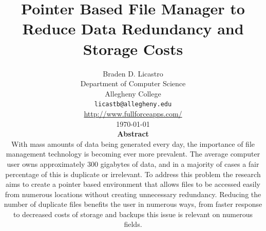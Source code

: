 \documentclass[11pt]{article}
\def\widow#1{\vskip #1\vbadness10000\penalty-200\vskip-#1}
\begin{document}



\def\widow#1{\vskip #1\vbadness10000\penalty-200\vskip-#1}


\makeatletter

\def\maketitle{%
  \thispagestyle{empty}%
  \begin{center}%
    {\Huge \@title\par}%
    {\normalsize \@author\par}%
    \vskip .4in
  \end{center}%

  }

\makeatother

\vspace*{-1.1in}
\title{Pointer Based File Manager to Reduce Data Redundancy and Storage Costs}

\author{Braden D. Licastro\\
Department of Computer Science\\
Allegheny College \\
{\tt licastb@allegheny.edu}  \\
\url{http://www.fullforceapps.com/} \\ 
\vspace*{.1in} \today \\ \vspace*{.1in}
{\bf Abstract} \\ With mass amounts of data being generated every day, the importance of file management technology is becoming ever more prevalent. The average computer user owns approximately 300 gigabytes of data, and in a majority of cases a fair percentage of this is duplicate or irrelevant. To address this problem the research aims to create a pointer based environment that allows files to be accessed easily from numerous locations without creating unnecessary redundancy. Reducing the number of duplicate files benefits the user in numerous ways, from faster response to decreased costs of storage and backups this issue is relevant on numerous fields.}
\end{document}
